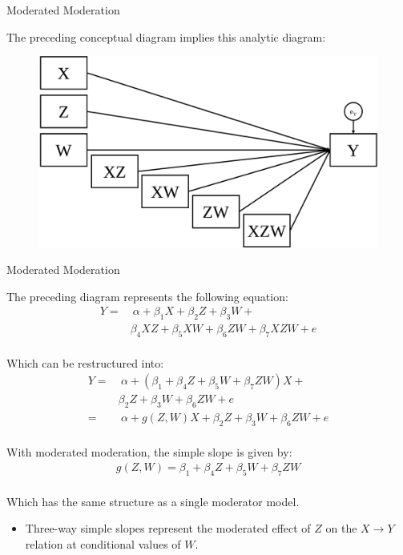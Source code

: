 \documentclass{beamer}
\newcommand{\vb}[0]{\vspace{6pt}}
\newcommand{\vc}[0]{\vspace{3pt}}
\begin{document}
\begin{frame}{Moderated Moderation}
  
  The preceding conceptual diagram implies this analytic diagram:
  \begin{figure}
    \includegraphics[width=\textwidth]{figures/threeWayAnalytic.pdf}
  \end{figure}
  
\end{frame}



\begin{frame}[shrink = 5]{Moderated Moderation}
  
  The preceding diagram represents the following equation:
  \begin{align*}
    Y =& ~ \alpha + \beta_1X + \beta_2Z + \beta_3W +\\
    &\beta_4XZ + \beta_5XW + \beta_6ZW + \beta_7XZW + e
  \end{align*}\\
  \vb
  Which can be restructured into:
  \begin{align*}
    Y =& ~ \alpha + (\beta_1 + \beta_4Z + \beta_5W + \beta_7ZW)X + \\
    &\beta_2Z + \beta_3W + \beta_6ZW + e\\
    =& ~ \alpha + g(Z, W)X + \beta_2Z + \beta_3W + \beta_6ZW + e
  \end{align*}\\
  \vb 
  With moderated moderation, the simple slope is given by:
  \begin{align*}
    g(Z, W) = \beta_1 + \beta_4Z + \beta_5W + \beta_7ZW
  \end{align*}\\
  \vb 
  Which has the same structure as a single moderator model.
  \vc
  \begin{itemize}
  \item Three-way simple slopes represent the moderated effect of
    $Z$ on the $X \rightarrow Y$ relation at conditional values of $W$.
  \end{itemize}
  
\end{frame}
\end{document}
